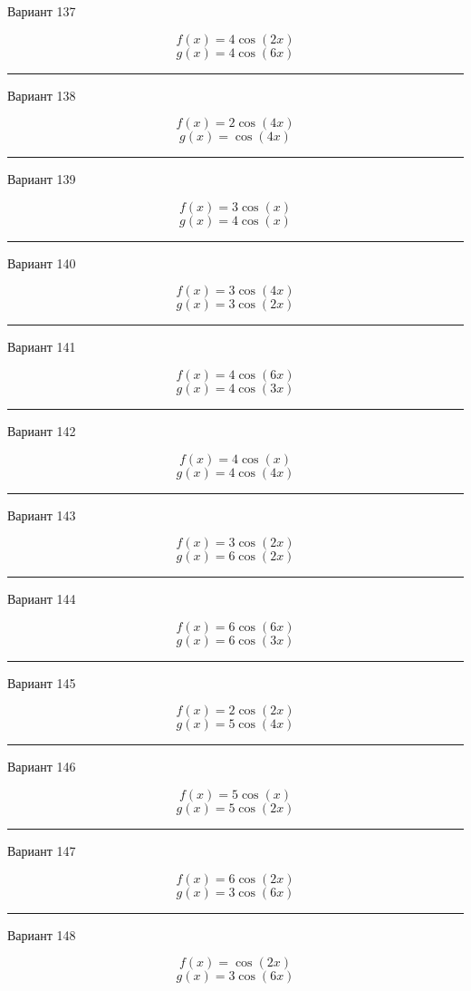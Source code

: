 \documentclass[11pt]{report}
\begin{document}
Вариант 137

$$f(x)=4 \cos{\left(2 x \right)}$$
$$g(x)=4 \cos{\left(6 x \right)}$$

\rule{\textwidth}{.2mm}

Вариант 138

$$f(x)=2 \cos{\left(4 x \right)}$$
$$g(x)=\cos{\left(4 x \right)}$$

\rule{\textwidth}{.2mm}

Вариант 139

$$f(x)=3 \cos{\left(x \right)}$$
$$g(x)=4 \cos{\left(x \right)}$$

\rule{\textwidth}{.2mm}

Вариант 140

$$f(x)=3 \cos{\left(4 x \right)}$$
$$g(x)=3 \cos{\left(2 x \right)}$$

\rule{\textwidth}{.2mm}

Вариант 141

$$f(x)=4 \cos{\left(6 x \right)}$$
$$g(x)=4 \cos{\left(3 x \right)}$$

\rule{\textwidth}{.2mm}

Вариант 142

$$f(x)=4 \cos{\left(x \right)}$$
$$g(x)=4 \cos{\left(4 x \right)}$$

\rule{\textwidth}{.2mm}

Вариант 143

$$f(x)=3 \cos{\left(2 x \right)}$$
$$g(x)=6 \cos{\left(2 x \right)}$$

\rule{\textwidth}{.2mm}

Вариант 144

$$f(x)=6 \cos{\left(6 x \right)}$$
$$g(x)=6 \cos{\left(3 x \right)}$$

\rule{\textwidth}{.2mm}

Вариант 145

$$f(x)=2 \cos{\left(2 x \right)}$$
$$g(x)=5 \cos{\left(4 x \right)}$$

\rule{\textwidth}{.2mm}

Вариант 146

$$f(x)=5 \cos{\left(x \right)}$$
$$g(x)=5 \cos{\left(2 x \right)}$$

\rule{\textwidth}{.2mm}

Вариант 147

$$f(x)=6 \cos{\left(2 x \right)}$$
$$g(x)=3 \cos{\left(6 x \right)}$$

\rule{\textwidth}{.2mm}

Вариант 148

$$f(x)=\cos{\left(2 x \right)}$$
$$g(x)=3 \cos{\left(6 x \right)}$$
\end{document}
